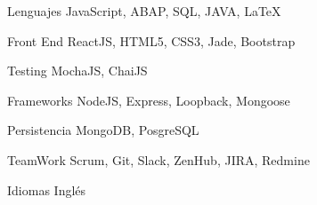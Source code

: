 


\begin{cvskills}


\cvskill
{Lenguajes} %
{JavaScript, ABAP, SQL, JAVA, \LaTeX{} } %

\cvskill
{Front End} %
{ReactJS, HTML5, CSS3, Jade, Bootstrap} %

\cvskill
{Testing} %
{MochaJS, ChaiJS} %

\cvskill
{Frameworks} %
{NodeJS, Express, Loopback, Mongoose} %

\cvskill
{Persistencia} %
{MongoDB, PosgreSQL} %

\cvskill
{TeamWork} %
{Scrum, Git, Slack, ZenHub, JIRA, Redmine} %

\cvskill
{Idiomas} %
{Inglés} %


\end{cvskills}
